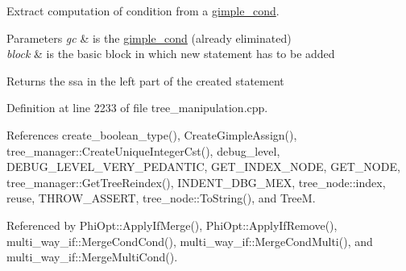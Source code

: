 Extract computation of condition from a \hyperlink{structgimple__cond}{gimple\+\_\+cond}. 


\begin{DoxyParams}{Parameters}
{\em gc} & is the \hyperlink{structgimple__cond}{gimple\+\_\+cond} (already eliminated) \\
\hline
{\em block} & is the basic block in which new statement has to be added \\
\hline
\end{DoxyParams}
\begin{DoxyReturn}{Returns}
the ssa in the left part of the created statement 
\end{DoxyReturn}


Definition at line 2233 of file tree\+\_\+manipulation.\+cpp.



References create\+\_\+boolean\+\_\+type(), Create\+Gimple\+Assign(), tree\+\_\+manager\+::\+Create\+Unique\+Integer\+Cst(), debug\+\_\+level, D\+E\+B\+U\+G\+\_\+\+L\+E\+V\+E\+L\+\_\+\+V\+E\+R\+Y\+\_\+\+P\+E\+D\+A\+N\+T\+IC, G\+E\+T\+\_\+\+I\+N\+D\+E\+X\+\_\+\+N\+O\+DE, G\+E\+T\+\_\+\+N\+O\+DE, tree\+\_\+manager\+::\+Get\+Tree\+Reindex(), I\+N\+D\+E\+N\+T\+\_\+\+D\+B\+G\+\_\+\+M\+EX, tree\+\_\+node\+::index, reuse, T\+H\+R\+O\+W\+\_\+\+A\+S\+S\+E\+RT, tree\+\_\+node\+::\+To\+String(), and TreeM.



Referenced by Phi\+Opt\+::\+Apply\+If\+Merge(), Phi\+Opt\+::\+Apply\+If\+Remove(), multi\+\_\+way\+\_\+if\+::\+Merge\+Cond\+Cond(), multi\+\_\+way\+\_\+if\+::\+Merge\+Cond\+Multi(), and multi\+\_\+way\+\_\+if\+::\+Merge\+Multi\+Cond().

